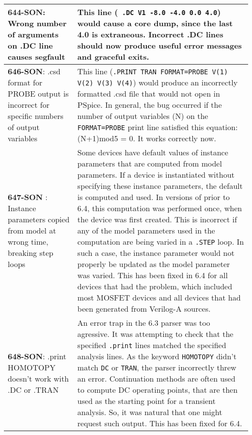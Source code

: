 {\begin{longtable}[h] {>{\raggedright\small}m{2in}|>{\raggedright\let\\\tabularnewline\small}m{3.5in}}
     \textbf{644-SON}: Wrong number of arguments on .DC line causes segfault &
     This line (\texttt{ .DC V1 -8.0 -4.0 0.0 4.0}) would cause a core dump,
     since the last 4.0 is extraneous.  Incorrect .DC lines should now produce
     useful error messages and graceful exits.  
     \\ \hline

     \textbf{646-SON}: .csd format for PROBE output is incorrect for specific
     numbers of output variables & This line (\texttt{.PRINT TRAN FORMAT=PROBE
     V(1) V(2) V(3) V(4)}) would produce an incorrectly formatted .csd file
     that would not open in PSpice.  In general, the bug occurred if the number
     of output variables (N) on the \texttt{FORMAT=PROBE} print line satisfied
     this equation: (N+1)mod5 = 0.  It works correctly now.  
     \\ \hline

     \textbf{647-SON }: Instance parameters copied from model at wrong time,
     breaking step loops  & Some devices have default values of instance
     parameters that are computed from model parameters.  If a device is
     instantiated without specifying these instance parameters, the default is
     computed and used.  In versions of \Xyce{} prior to 6.4, this computation
     was performed once, when the device was first created.  This is incorrect
     if any of the model parameters used in the computation are being varied in
     a \texttt{.STEP} loop.  In such a case, the instance parameter would not
     properly be updated as the model parameter was varied.  This has been
     fixed in \Xyce{} 6.4 for all devices that had the problem, which included
     most MOSFET devices and all devices that had been generated from Verilog-A
     sources.  
     \\ \hline

     \textbf{648-SON}: .print HOMOTOPY doesn't work with .DC or .TRAN &
     An error trap in the \Xyce{} 6.3 parser was too agressive.  It was attempting
     to check that the specified \texttt{.print} lines matched the specified 
     analysis lines.  As the keyword \texttt{HOMOTOPY} didn't match \texttt{DC}
     or \texttt{TRAN}, the parser incorrectly threw an error.  Continuation
     methods are often used to compute DC operating points, that are then used
     as the starting point for a transient analysis.  So, it was natural that one might request
     such output.  This has been fixed for \Xyce{} 6.4.
     \\ \hline


\end{longtable}}
